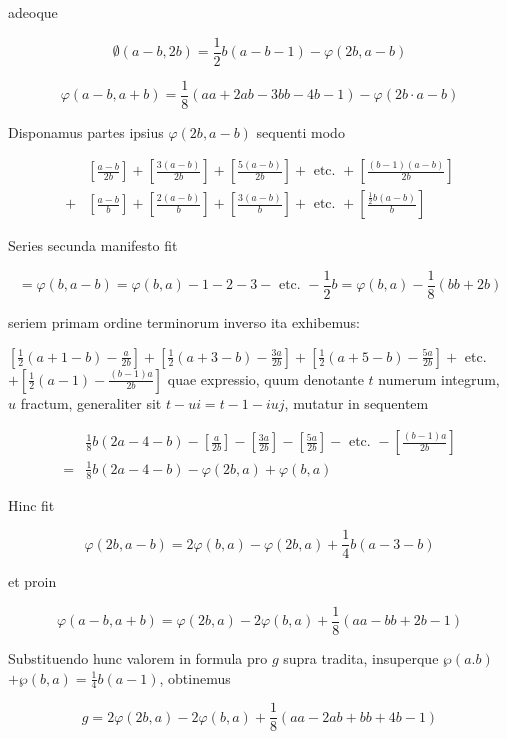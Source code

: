 \documentclass[10pt]{article}
\begin{document}
adeoque

\[
\emptyset(a-b, 2 b)=\frac{1}{2} b(a-b-1)-\varphi(2 b, a-b)
\]

\[
\varphi(a-b, a+b)=\frac{1}{8}(a a+2 a b-3 b b-4 b-1)-\varphi(2 b \cdot a-b)
\]

Disponamus partes ipsius \(\varphi(2 b, a-b)\) sequenti modo

\[
\begin{aligned}
& {\left[\frac{a-b}{2 b}\right]+\left[\frac{3(a-b)}{2 b}\right]+\left[\frac{5(a-b)}{2 b}\right]+\text { etc. }+\left[\frac{(b-1)(a-b)}{2 b}\right] } \\
+ & {\left[\frac{a-b}{b}\right]+\left[\frac{2(a-b)}{b}\right]+\left[\frac{3(a-b)}{b}\right]+\text { etc. }+\left[\frac{\frac{1}{2} b(a-b)}{b}\right] }
\end{aligned}
\]

Series secunda manifesto fit

\[
=\varphi(b, a-b)=\varphi(b, a)-1-2-3-\text { etc. }-\frac{1}{2} b=\varphi(b, a)-\frac{1}{8}(b b+2 b)
\]

seriem primam ordine terminorum inverso ita exhibemus:

\(\left[\frac{1}{2}(a+1-b)-\frac{a}{2 b}\right]+\left[\frac{1}{2}(a+3-b)-\frac{3 a}{2 b}\right]+\left[\frac{1}{2}(a+5-b)-\frac{5 a}{2 b}\right]+\) etc. \(+\left[\frac{1}{2}(a-1)-\frac{(b-1) a}{2 b}\right]\) quae expressio, quum denotante \(t\) numerum integrum, \(u\) fractum, generaliter sit \(t-u i=t-1-i u j\), mutatur in sequentem

\[
\begin{aligned}
& \frac{1}{8} b(2 a-4-b)-\left[\frac{a}{2 b}\right]-\left[\frac{3 a}{2 b}\right]-\left[\frac{5 a}{2 b}\right]-\text { etc. }-\left[\frac{(b-1) a}{2 b}\right] \\
= & \frac{1}{8} b(2 a-4-b)-\varphi(2 b, a)+\varphi(b, a)
\end{aligned}
\]

Hinc fit

\[
\varphi(2 b, a-b)=2 \varphi(b, a)-\varphi(2 b, a)+\frac{1}{4} b(a-3-b)
\]

et proin

\[
\varphi(a-b, a+b)=\varphi(2 b, a)-2 \varphi(b, a)+\frac{1}{8}(a a-b b+2 b-1)
\]

Substituendo hunc valorem in formula pro \(g\) supra tradita, insuperque \(\wp(a . b)\) \(+\wp(b, a)=\frac{1}{4} b(a-1)\), obtinemus

\[
g=2 \varphi(2 b, a)-2 \varphi(b, a)+\frac{1}{8}(a a-2 a b+b b+4 b-1)
\]
\end{document}

